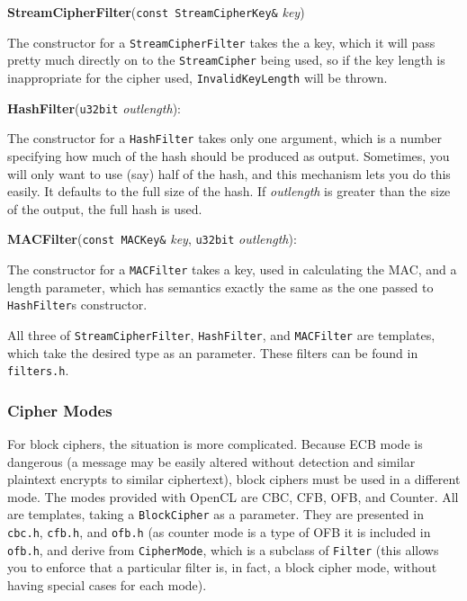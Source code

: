 \documentclass{article}
\newcommand{\filename}[1]{\texttt{#1}}
\newcommand{\function}[1]{\textbf{#1}}
\newcommand{\type}[1]{\texttt{#1}}
\renewcommand{\arg}[1]{\textsl{#1}}
\begin{document}
\vskip 10pt \noindent
\function{StreamCipherFilter}(\type{const StreamCipherKey\&} \arg{key})

\vskip 5pt
The constructor for a \type{StreamCipherFilter} takes the a key, which it will
pass pretty much directly on to the \type{StreamCipher} being used, so if the
key length is inappropriate for the cipher used, \type{InvalidKeyLength} will
be thrown.

\vskip 10pt \noindent
\function{HashFilter}(\type{u32bit} \arg{outlength}):

\vskip 5pt
The constructor for a \type{HashFilter} takes only one argument, which is a
number specifying how much of the hash should be produced as output.
Sometimes, you will only want to use (say) half of the hash, and this mechanism
lets you do this easily. It defaults to the full size of the hash. If
\arg{outlength} is greater than the size of the output, the full hash is used.

\vskip 10pt \noindent
\function{MACFilter}(\type{const MACKey\&} \arg{key},
                     \type{u32bit} \arg{outlength}):

\vskip 5pt
The constructor for a \type{MACFilter} takes a key, used in calculating the
MAC, and a length parameter, which has semantics exactly the same as the one
passed to \type{HashFilter}s constructor.

\vskip 10pt
All three of \type{StreamCipherFilter}, \type{HashFilter}, and \type{MACFilter}
are templates, which take the desired type as an parameter. These filters can
be found in \filename{filters.h}.

\subsubsection{Cipher Modes}

For block ciphers, the situation is more complicated. Because ECB mode is
dangerous (a message may be easily altered without detection and similar
plaintext encrypts to similar ciphertext), block ciphers must be used in a
different mode. The modes provided with OpenCL are CBC, CFB, OFB, and
Counter. All are templates, taking a \type{BlockCipher} as a parameter. They
are presented in \filename{cbc.h}, \filename{cfb.h}, and \filename{ofb.h} (as
counter mode is a type of OFB it is included in \filename{ofb.h}, and derive
from \type{CipherMode}, which is a subclass of \type{Filter} (this allows you
to enforce that a particular filter is, in fact, a block cipher mode, without
having special cases for each mode).
\end{document}
